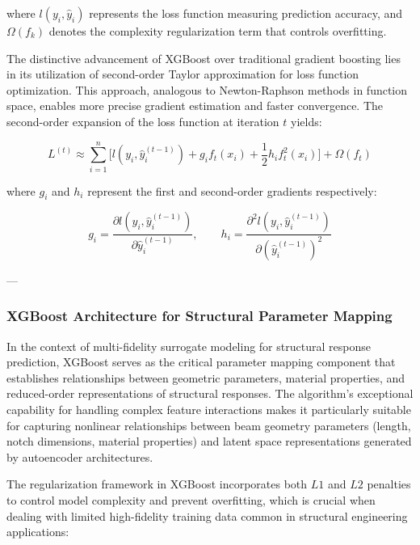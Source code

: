 \documentclass[12pt,a4paper]{report}
\begin{document}
where $l(y_i, \hat{y}_i)$ represents the loss function measuring prediction accuracy, and $\Omega(f_k)$ denotes the complexity regularization term that controls overfitting.

The distinctive advancement of XGBoost over traditional gradient boosting lies in its utilization of second-order Taylor approximation for loss function optimization. This approach, analogous to Newton-Raphson methods in function space, enables more precise gradient estimation and faster convergence.  
The second-order expansion of the loss function at iteration $t$ yields:

\begin{equation}
L^{(t)} \approx \sum_{i=1}^n \Big[ l(y_i, \hat{y}_i^{(t-1)}) + g_i f_t(x_i) + \frac{1}{2} h_i f_t^2(x_i) \Big] + \Omega(f_t)
\end{equation}

where $g_i$ and $h_i$ represent the first and second-order gradients respectively:

\begin{equation}
g_i = \frac{\partial l(y_i, \hat{y}_i^{(t-1)})}{\partial \hat{y}_i^{(t-1)}}, 
\qquad 
h_i = \frac{\partial^2 l(y_i, \hat{y}_i^{(t-1)})}{\partial (\hat{y}_i^{(t-1)})^2}
\end{equation}

---

\subsubsection*{XGBoost Architecture for Structural Parameter Mapping}

In the context of multi-fidelity surrogate modeling for structural response prediction, XGBoost serves as the critical parameter mapping component that establishes relationships between geometric parameters, material properties, and reduced-order representations of structural responses. The algorithm's exceptional capability for handling complex feature interactions makes it particularly suitable for capturing nonlinear relationships between beam geometry parameters (length, notch dimensions, material properties) and latent space representations generated by autoencoder architectures.

The regularization framework in XGBoost incorporates both $L1$ and $L2$ penalties to control model complexity and prevent overfitting, which is crucial when dealing with limited high-fidelity training data common in structural engineering applications:
\end{document}
